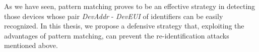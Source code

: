 \vspace{5mm}

As we have seen, pattern matching proves to be an effective strategy in detecting those devices whose pair \textit{DevAddr} - \textit{DevEUI} of identifiers can be easily recognized. In this thesis, we propose a defensive strategy that, exploiting the advantages of pattern matching, can prevent the re-identification attacks mentioned above.